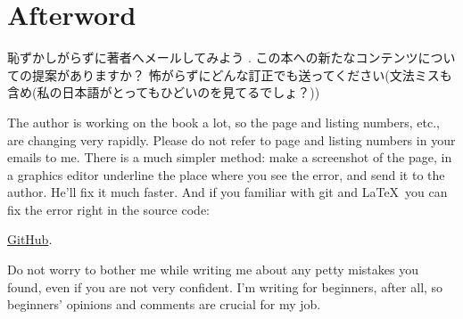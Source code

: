 \part*{Afterword}


恥ずかしがらずに著者へメールしてみよう
\GTT{\EMAILS}.
この本への新たなコンテンツについての提案がありますか？
怖がらずにどんな訂正でも送ってください(文法ミスも含め(私の日本語がとってもひどいのを見てるでしょ？))

The author is working on the book a lot, so the page and listing numbers, etc., are changing very rapidly.
Please do not refer to page and listing numbers in your emails to me.
There is a much simpler method: make a screenshot of the page, in a graphics editor underline the place where you see the error,
and send it to the author. He'll fix it much faster.
And if you familiar with git and \LaTeX\, you can fix the error right in the source code: 

\href{http://go.yurichev.com/17089}{GitHub}.

Do not worry to bother me while writing me about any petty mistakes you found, even if you are not very confident.
I'm writing for beginners, after all, so beginners' opinions and comments are crucial for my job.
